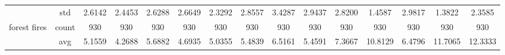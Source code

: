 \begin{table}[H]
{\begin{tabular}{rcccc|c|c|c|c|c|ccccc}
			                                                                               & std                                    & 2.6142                                                                             & 2.4453                                                                    & 2.6288                                                                    & 2.6649                                         & 2.3292                                                                    & 2.8557                                       & 3.4287                                      & 2.9437                                         & 2.8200                                         & 1.4587                                          & 2.9817                                          & 1.3822                                         & 2.3585                                         \\
			forest fires                                                                   & count                                  & 930                                                                                & 930                                                                       & 930                                                                       & 930                                            & 930                                                                       & 930                                          & 930                                         & 930                                            & 930                                            & 930                                             & 930                                             & 930                                            & 930                                            \\
			                                                                               & avg                                    & 5.1559                                                                             & \cellcolor[rgb]{ .776,  .937,  .808}\textcolor[rgb]{ 0,  .38,  0}{4.2688} & 5.6882                                                                    & 4.6935                                         & 5.0355                                                                    & 5.4839                                       & 6.5161                                      & 5.4591                                         & 7.3667                                         & 10.8129                                         & 6.4796                                          & 11.7065                                        & 12.3333                                        \\

\end{tabular}}
\end{table}
